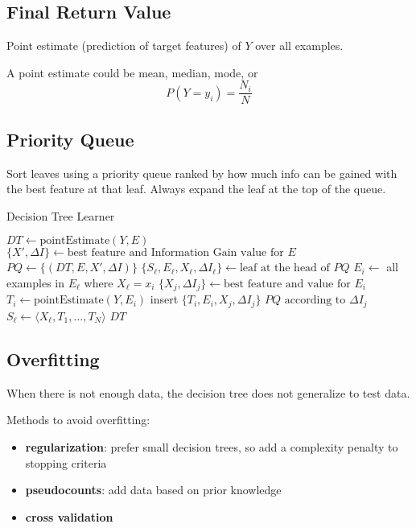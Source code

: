 \documentclass[11pt]{article}
\begin{document}
\subsection{Final Return Value}
\label{sec:orgd2f36a6}
Point estimate (prediction of target features) of \(Y\) over all examples.

A point estimate could be mean, median, mode, or
$$
P(Y = y_{i}) = \frac{N_{i}}{N}
$$
\subsection{Priority Queue}
\label{sec:org1f217d0}
Sort leaves using a priority queue ranked by how much info can be gained with the best feature at that
leaf.
Always expand the leaf at the top of the queue.

\begin{algorithm}
\caption{Decision Tree Learner}
\begin{algorithmic}[1]
    \State \( DT \gets \text{pointEstimate}(Y, E) \) 
    \State \( \{ X', \Delta I \} \gets \text{best feature and Information Gain value for } E \)
    \State \( PQ \gets \{ (DT, E, X', \Delta I) \} \) 
        \State \( \{ S_\ell, E_\ell, X_\ell, \Delta I_\ell \} \gets \text{leaf at the head of } PQ \)
            \State \( E_i \gets \) all examples in \( E_\ell \) where \( X_\ell = x_i \)
            \State \( \{ X_j, \Delta I_j \} \gets \text{best feature and value for } E_i \)
            \State \( T_i \gets \text{pointEstimate}(Y, E_i) \)
            \State insert \( \{ T_i, E_i, X_j, \Delta I_j \} \)  \( PQ \text{ according to } \Delta I_j \)
        \EndFor
        \State \( S_\ell \gets \langle X_\ell, T_1, \ldots, T_N \rangle \)
    \EndWhile
    \State \Return \( DT \)
\EndProcedure
\end{algorithmic}
\end{algorithm}
\subsection{Overfitting}
\label{sec:org4a401f2}
When there is not enough data, the decision tree does not generalize to test data.

Methods to avoid overfitting:
\begin{itemize}
\item \textbf{regularization}: prefer small decision trees, so add a complexity penalty to stopping criteria
\item \textbf{pseudocounts}: add data based on prior knowledge
\item \textbf{cross validation}
\end{itemize}
\end{document}
